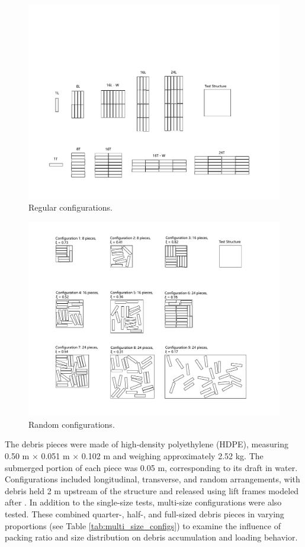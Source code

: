 \documentclass{article}
\begin{document}
{\begin{figure}[htbp]
    \centering
    \includegraphics[angle=-90, width=1.4\textwidth]{Configurations.pdf}
    \caption{Regular configurations.}
    \label{fig:configurations}
\end{figure}


\begin{figure}[htbp]
    \centering
    \includegraphics[width=1.5\textwidth]{configurations_rand.pdf}
    \caption{Random configurations.}
    \label{fig:configurations_random}
\end{figure}

The debris pieces were made of high-density polyethylene (HDPE), measuring 0.50 m × 0.051 m × 0.102 m and weighing approximately 2.52 kg. The submerged portion of each piece was 0.05 m, corresponding to its draft in water. Configurations included longitudinal, transverse, and random arrangements, with debris held 2 m upstream of the structure and released using lift frames modeled after \citet{Shekhar2020}. In addition to the single-size tests, multi-size configurations were also tested. These combined quarter-, half-, and full-sized debris pieces in varying proportions (see Table \ref{tab:multi_size_configs}) to examine the influence of packing ratio and size distribution on debris accumulation and loading behavior. 

}
\end{document}
